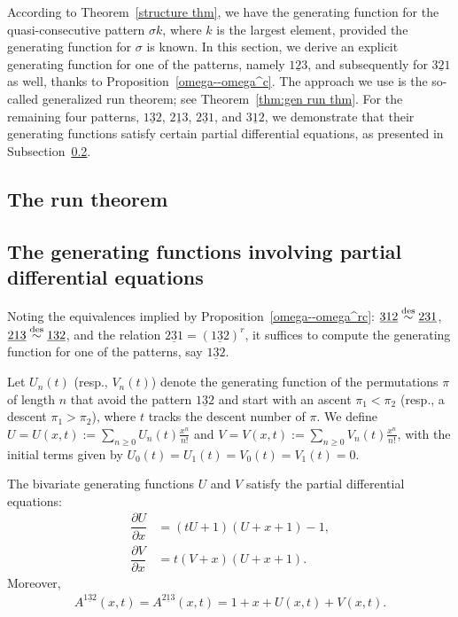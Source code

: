 According to Theorem~\ref{structure thm}, we have the generating function for the quasi-consecutive pattern $\sigma k$, where $k$ is the largest element, provided the generating function for $\sigma$ is known. In this section, we derive an explicit generating function for one of the patterns, namely $\underline{123}$, and subsequently for $\underline{321}$ as well, thanks to Proposition~\ref{omega--omega^c}. The approach we use is the so-called generalized run theorem; see Theorem~\ref{thm:gen run thm}. For the remaining four patterns, $\underline{132}$, $\underline{213}$, $\underline{231}$, and $\underline{312}$, we demonstrate that their generating functions satisfy certain partial differential equations, as presented in Subsection~\ref{subsec:g.f.132}.

\subsection{The run theorem} \label{subsec:run theorem}



\subsection{The generating functions involving partial differential equations} \label{subsec:g.f.132}
Noting the equivalences implied by Proposition~\ref{omega--omega^rc}: $\underline{312} \overset{\mathrm{des}}{\sim }\underline{231} $, $\underline{213} \overset{\mathrm{des}}{\sim }\underline{132}$, and the relation $\underline{231}=(\underline{132})^r$, it suffices to compute the generating function for one of the patterns, say $\underline{132}$.

Let $U_n(t)$ (resp., $V_n(t)$) denote the generating function of the permutations $\pi$ of length $n$ that avoid the pattern $\underline{132}$ and start with an ascent $\pi_1 < \pi_2$ (resp., a descent $\pi_1 > \pi_2$), where $t$ tracks the descent number of $\pi$.
We define $U = U(x,t) := \sum_{n \geq 0} U_n(t) \frac{x^n}{n!}$ and $V = V(x,t) := \sum_{n \geq 0} V_n(t) \frac{x^n}{n!}$, with the initial terms given by $U_0(t) = U_1(t) = V_0(t) = V_1(t) = 0$.

\begin{proposition} \label{132}
The bivariate generating functions $U$ and $V$ satisfy the partial differential equations:
    \begin{align*}
    \dfrac{\partial U}{\partial x} &=(tU+1)(U+x+1)-1,\\
    \dfrac{\partial V}{\partial x} &=t(V+x)(U+x+1).
    \end{align*}
    Moreover,
    \begin{align*}
    A^{\underline{132}}(x,t)=A^{\underline{213}}(x,t)=1+x+U(x,t)+V(x,t).
    \end{align*}
\end{proposition}

